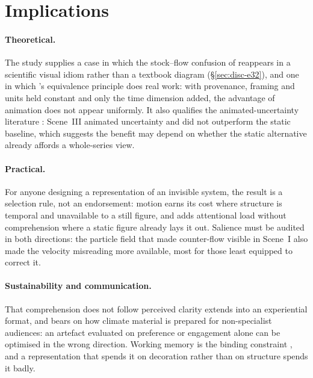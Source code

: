 \section{Implications}
\label{sec:disc-implications}

\paragraph{Theoretical.} The study supplies a case in which the stock--flow confusion of \textcite{sterman2008} reappears in a scientific visual idiom rather than a textbook diagram (\S\ref{sec:disc-e32}), and one in which \textcite{tversky2002}'s equivalence principle does real work: with provenance, framing and units held constant and only the time dimension added, the advantage of animation does not appear uniformly. It also qualifies the animated-uncertainty literature \parencite{hullman2015hops, kale2019hops}: Scene~III animated uncertainty and did not outperform the static baseline, which suggests the benefit may depend on whether the static alternative already affords a whole-series view.

\paragraph{Practical.} For anyone designing a representation of an invisible system, the result is a selection rule, not an endorsement: motion earns its cost where structure is temporal and unavailable to a still figure, and adds attentional load without comprehension where a static figure already lays it out. Salience must be audited in both directions: the particle field that made counter-flow visible in Scene~I also made the velocity misreading more available, most for those least equipped to correct it.

\paragraph{Sustainability and communication.} That comprehension does not follow perceived clarity extends \textcite{hegarty2012} into an experiential format, and bears on how climate material is prepared for non-specialist audiences: an artefact evaluated on preference or engagement alone can be optimised in the wrong direction. Working memory is the binding constraint \parencite{sweller1988}, and a representation that spends it on decoration rather than on structure spends it badly.

